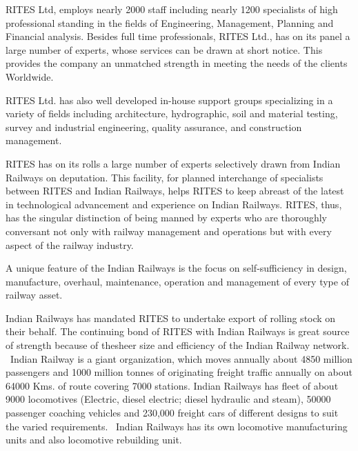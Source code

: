 \bigskip

{\color[rgb]{0.0,0.0,0.039215688}
RITES Ltd, employs nearly 2000 staff including nearly 1200 specialists of high professional standing in the fields of
Engineering, Management, Planning and Financial analysis. Besides full time professionals, RITES Ltd., has on its panel
a large number of experts, whose services can be drawn at short notice. This provides the company an unmatched strength
in meeting the needs of the clients Worldwide.}


\bigskip

{\color[rgb]{0.0,0.0,0.039215688}
RITES Ltd. has also well developed in-house support groups specializing in a variety of fields including architecture,
hydrographic, soil and material testing, survey and industrial engineering, quality assurance, and construction
management.}


\bigskip

{\color[rgb]{0.0,0.0,0.039215688}
RITES has on its rolls a large number of experts selectively drawn from Indian Railways on deputation. This facility,
for planned interchange of specialists between RITES and Indian Railways, helps RITES to keep abreast of the latest in
technological advancement and experience on Indian Railways. RITES, thus, has the singular distinction of being manned
by experts who are thoroughly conversant not only with railway management and operations but with every aspect of the
railway industry. }


\bigskip

{\color[rgb]{0.0,0.0,0.039215688}
A unique feature of the Indian Railways is the focus on self-sufficiency in design, manufacture, overhaul, maintenance,
operation and management of every type of railway asset. }


\bigskip

{\color[rgb]{0.0,0.0,0.039215688}
Indian Railways has mandated RITES to undertake export of rolling stock on their behalf. The continuing bond of RITES
with Indian Railways is great source of strength because of thesheer size and efficiency of the Indian Railway network.
\ Indian Railway is a giant organization, which moves annually about 4850 million passengers and 1000 million tonnes of
originating freight traffic annually on about 64000 Kms. of route covering 7000 stations. Indian Railways has fleet of
about 9000 locomotives (Electric, diesel electric; diesel hydraulic and steam), 50000 passenger coaching vehicles and
230,000 freight cars of different designs to suit the varied requirements. \ Indian Railways has its own locomotive
manufacturing units and also locomotive rebuilding unit. }



